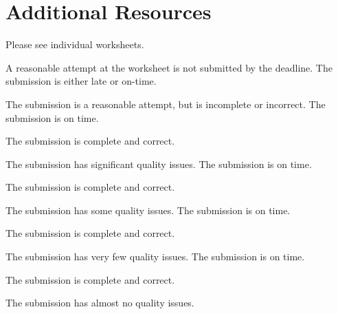 \documentclass{../../fal_assignment}
\begin{document}
	\section*{Additional Resources}
	
	Please see individual worksheets.
	
	
	\begin{markingrubric}
		\grade\fail	A reasonable attempt at the worksheet is not submitted by the deadline.
		\grade 		The submission is either late or on-time.
		\par		The submission is a reasonable attempt, but is incomplete or incorrect.
		\grade 		The submission is on time.
		\par 		The submission is complete and correct.
		\par		The submission has significant quality issues.
		\grade 		The submission is on time.
		\par 		The submission is complete and correct.
		\par		The submission has some quality issues.
		\grade 		The submission is on time.
		\par 		The submission is complete and correct.
		\par		The submission has very few quality issues.
		\grade 		The submission is on time.
		\par 		The submission is complete and correct.
		\par		The submission has almost no quality issues.
	\end{markingrubric}
	
\end{document}

